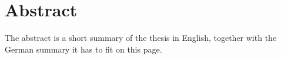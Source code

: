 \thispagestyle{plain}


\section*{Abstract}
The abstract is a short summary of the thesis in English, together with the German summary it has to fit on this page.

